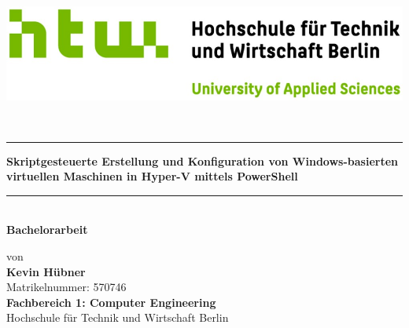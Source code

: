 \documentclass[a4paper,12pt]{article}
\begin{document}
\begin{titlepage}
    \thispagestyle{empty}
    \parindent=0pt
    \begin{minipage}[b]{0.35\textwidth}
        \includegraphics[width=\textwidth]{Pictures/htw-berlin_logo.jpg}
    \end{minipage}
    \begin{minipage}[b]{0.65\textwidth}
        ~
    \end{minipage}

    \vspace{0.5em}
    \textcolor{HTW}{\rule{\linewidth}{0.4mm}}


    \begin{center}
        {\LARGE\bfseries\color{HTW} Skriptgesteuerte Erstellung und Konfiguration von Windows-basierten virtuellen Maschinen in Hyper-V mittels PowerShell} \\[1em]
        \textcolor{HTW}{\rule{\linewidth}{0.4mm}}\\[1.5em]
        {\LARGE\bfseries Bachelorarbeit}
    \end{center}


    \begin{center}
        \normalsize %
        von\\[2ex]
        {\bfseries\large\fontsize{14pt}{16pt}\selectfont Kevin Hübner}\\[2ex]
        Matrikelnummer: 570746\\[4ex]
        {\bfseries\fontsize{13pt}{15pt}\selectfont Fachbereich 1: Computer Engineering}\\
        Hochschule für Technik und Wirtschaft Berlin\\[2ex]
    \end{center}



\end{titlepage}
\end{document}
